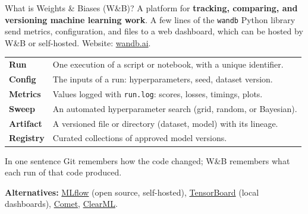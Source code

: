 \fi
\iftrackingdeck
\begin{frame}{What is Weights \& Biases (W\&B)?}
\begingroup\footnotesize
A platform for \textbf{tracking, comparing, and versioning machine learning work}. A few lines of the \texttt{wandb} Python library send metrics, configuration, and files to a web dashboard, which can be hosted by W\&B or self-hosted. Website: \href{https://wandb.ai}{wandb.ai}.
\vspace{0.5em}

\begin{tabularx}{\textwidth}{>{\bfseries}l X}
Run & One execution of a script or notebook, with a unique identifier. \\
\addlinespace[0.3em]
Config & The inputs of a run: hyperparameters, seed, dataset version. \\
\addlinespace[0.3em]
Metrics & Values logged with \texttt{run.log}: scores, losses, timings, plots. \\
\addlinespace[0.3em]
Sweep & An automated hyperparameter search (grid, random, or Bayesian). \\
\addlinespace[0.3em]
Artifact & A versioned file or directory (dataset, model) with its lineage. \\
\addlinespace[0.3em]
Registry & Curated collections of approved model versions. \\
\bottomrule
\end{tabularx}
\par\endgroup
\vspace{0.5em}
\begin{block}{In one sentence}
\footnotesize Git remembers how the code changed; W\&B remembers what each run of that code produced.
\end{block}
\vspace{0.3em}
{\scriptsize \textbf{Alternatives:} \href{https://mlflow.org}{MLflow} (open source, self-hosted), \href{https://www.tensorflow.org/tensorboard}{TensorBoard} (local dashboards), \href{https://www.comet.com}{Comet}, \href{https://clear.ml}{ClearML}.\par}
\coursefooter
\end{frame}

